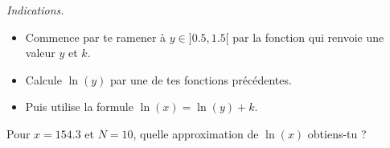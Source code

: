 \documentclass[11pt,class=report,crop=false]{standalone}
\begin{document}
\begin{activite}
\begin{enumerate}
	\emph{Indications.} 
	\begin{itemize}
	  \item Commence par te ramener à  $y \in ]0.5,1.5[$ par la fonction   qui renvoie une valeur $y$ et $k$.
	  \item Calcule $\ln(y)$ par une de tes fonctions précédentes.
	  \item Puis utilise la formule $\ln(x) = \ln(y) + k$.
    \end{itemize}
  \end{enumerate}
 
     Pour $x = 154.3$ et $N=10$, quelle approximation de $\ln(x)$ obtiens-tu ? 
     
     \bigskip
     
   
   
\end{activite}





\end{document}
